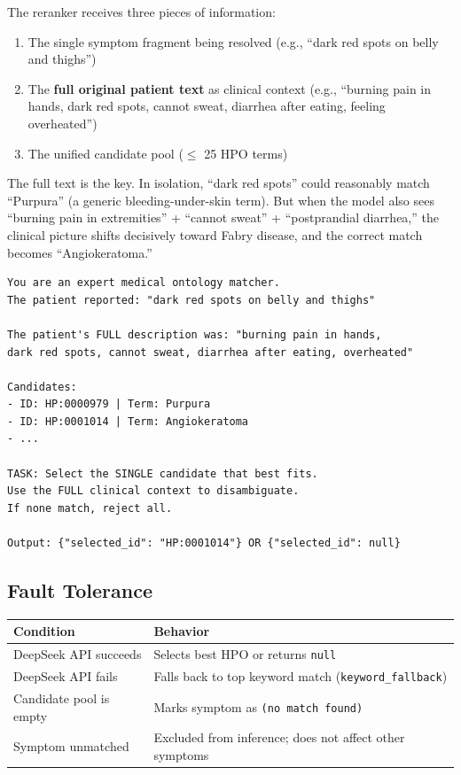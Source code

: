 \documentclass[11pt,a4paper]{article}
\begin{document}
The reranker receives three pieces of information:

\begin{enumerate}[leftmargin=*]
  \item The single symptom fragment being resolved (e.g., ``dark red spots on belly and thighs'')
  \item The \textbf{full original patient text} as clinical context (e.g., ``burning pain in hands, dark red spots, cannot sweat, diarrhea after eating, feeling overheated'')
  \item The unified candidate pool ($\leq$ 25 HPO terms)
\end{enumerate}

The full text is the key. In isolation, ``dark red spots'' could reasonably match ``Purpura'' (a generic bleeding-under-skin term). But when the model also sees ``burning pain in extremities'' + ``cannot sweat'' + ``postprandial diarrhea,'' the clinical picture shifts decisively toward Fabry disease, and the correct match becomes ``Angiokeratoma.''

\begin{lstlisting}[caption={Reranker prompt (abbreviated)}]
You are an expert medical ontology matcher.
The patient reported: "dark red spots on belly and thighs"

The patient's FULL description was: "burning pain in hands,
dark red spots, cannot sweat, diarrhea after eating, overheated"

Candidates:
- ID: HP:0000979 | Term: Purpura
- ID: HP:0001014 | Term: Angiokeratoma
- ...

TASK: Select the SINGLE candidate that best fits.
Use the FULL clinical context to disambiguate.
If none match, reject all.

Output: {"selected_id": "HP:0001014"} OR {"selected_id": null}
\end{lstlisting}

\subsection{Fault Tolerance}

\begin{table}[H]
\centering
\begin{tabular}{@{}ll@{}}
\toprule
\textbf{Condition} & \textbf{Behavior} \\
\midrule
DeepSeek API succeeds & Selects best HPO or returns \texttt{null} \\
DeepSeek API fails & Falls back to top keyword match (\texttt{keyword\_fallback}) \\
Candidate pool is empty & Marks symptom as \texttt{(no match found)} \\
Symptom unmatched & Excluded from inference; does not affect other symptoms \\
\bottomrule
\end{tabular}
\end{table}
\end{document}
